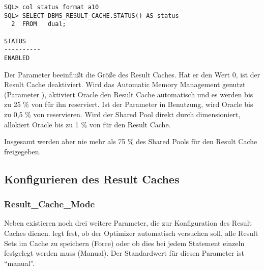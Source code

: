         \begin{lstlisting}[caption={Welchen Status hat der Result Cache?},label=admin702,language=oracle_sql,alsolanguage=sqlplus]
SQL> col status format a10
SQL> SELECT DBMS_RESULT_CACHE.STATUS() AS status
  2  FROM   dual;

STATUS
----------
ENABLED
        \end{lstlisting}
        Der  Parameter beeinflu\ss{}t die Gr\"o\ss{}e des Result Caches. Hat er den Wert 0, ist der Result Cache deaktiviert. Wird das Automatic Memory Management genutzt (Parameter ), aktiviert Oracle den Result Cache automatisch und es werden bis zu 25 \% von  f\"ur ihn reserviert. Ist der Parameter  in Benutzung, wird Oracle bis zu 0,5 \% von  reservieren. Wird der Shared Pool direkt durch  dimensioniert, allokiert Oracle bis zu 1 \% von  f\"ur den Result Cache.

        Insgesamt werden aber nie mehr als 75 \% des Shared Pools f\"ur den Result Cache freigegeben.
      \subsection{Konfigurieren des Result Caches}
        \subsubsection{Result\_Cache\_Mode}
          Neben  existieren noch drei weitere Parameter, die zur Konfiguration des Result Caches dienen.  legt fest, ob der Optimizer automatisch versuchen soll, alle Result Sets im Cache zu speichern (Force) oder ob dies bei jedem Statement einzeln festgelegt werden muss (Manual). Der Standardwert f\"ur diesen Parameter ist \enquote{manual}.

